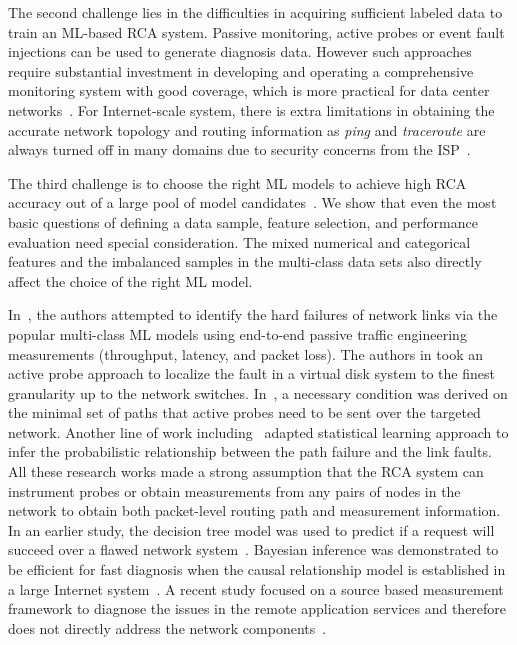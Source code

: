 The second challenge lies in the difficulties in acquiring sufficient labeled data to train an ML-based RCA system. Passive monitoring, active probes or event fault injections can be used to generate diagnosis data. However such approaches require substantial investment in developing and operating a comprehensive monitoring system with good coverage, which is more practical for data center networks~\cite{NetPoirot:Sigcomm2016,active:iot:2019}. For Internet-scale system, there is extra limitations in obtaining the accurate network topology and routing information as {\it ping} and {\it traceroute} are always turned off in many domains due to security concerns from the ISP~\cite{topology_obf_20}.

The third challenge is to choose the right ML models to achieve high RCA accuracy out of a large pool of model candidates~\cite{Boutaba:2018aa}. We show that even the most basic questions of defining a data sample, feature selection, and performance evaluation need special consideration. The mixed numerical and categorical features and the imbalanced samples in the multi-class data sets also directly affect the choice of the right ML model.

In~\cite{Link-JIoT-2019}, the authors attempted to identify the hard failures of network links via the popular multi-class ML models using end-to-end passive traffic engineering measurements (throughput, latency, and packet loss). The authors in \cite{DeepView:NSDI18} took an active probe approach to localize the fault in a virtual disk system to the finest granularity up to the network switches. In~\cite{netbouncer:nsdi18}, a necessary condition was derived on the minimal set of paths that active probes need to be sent over the targeted network. Another line of work including~\cite{KDD14,detector:atc17,arzani2018democratically} adapted statistical learning approach to infer the probabilistic relationship between the path failure and the link faults. All these research works made a strong assumption that the RCA system can instrument probes or obtain measurements from any pairs of nodes in the network to obtain both packet-level routing path and measurement information. In an earlier study, the decision tree model was used to predict if a request will succeed over a flawed network system~\cite{DT:2004}. Bayesian inference was demonstrated to be efficient for fast diagnosis when the causal relationship model is established in a large Internet system~\cite{BN-Internet:2007}. A recent study focused on a source based measurement framework to diagnose the issues in the remote application services and therefore does not directly address the network components~\cite{microrca:noms2020}.

